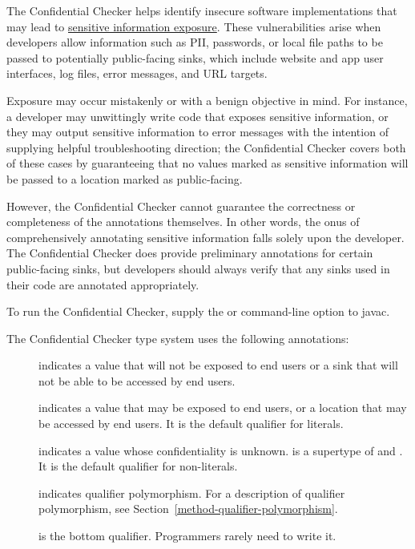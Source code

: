 \htmlhr
{}

The Confidential Checker helps identify insecure software implementations that may
lead to \href{https://cwe.mitre.org/data/definitions/1417.html}{sensitive information
exposure}. These vulnerabilities arise when developers allow information such as PII,
passwords, or local file paths to be passed to potentially public-facing sinks, which
include website and app user interfaces, log files, error messages, and URL targets.

Exposure may occur mistakenly or with a benign objective in mind. For instance, a developer
may unwittingly write code that exposes sensitive information, or they may output
sensitive information to error messages with the intention of supplying helpful
troubleshooting direction; the Confidential Checker covers both of these cases by
guaranteeing that no values marked as sensitive information will be passed to a
location marked as public-facing.

However, the Confidential Checker cannot guarantee the correctness or completeness
of the annotations themselves. In other words, the onus of comprehensively annotating
sensitive information falls solely upon the developer. The Confidential Checker does
provide preliminary annotations for certain public-facing sinks, but developers should
always verify that any sinks used in their code are annotated appropriately.

To run the Confidential Checker, supply the
or
command-line option to javac.



The Confidential Checker type system uses the following annotations:

\begin{description}
\item[]
    indicates a value that will not be exposed to end users or a sink that
    will not be able to be accessed by end users.
\item[]
    indicates a value that may be exposed to end users, or a location that
    may be accessed by end users. It is the default qualifier for literals.
\item[]
    indicates a value whose confidentiality is unknown.
     is a supertype of 
    and . It is the default qualifier for non-literals.
\item[]
    indicates qualifier polymorphism. For a description of qualifier polymorphism,
    see Section~\ref{method-qualifier-polymorphism}.
\item[]
    is the bottom qualifier. Programmers rarely need to write it.
\end{description}

